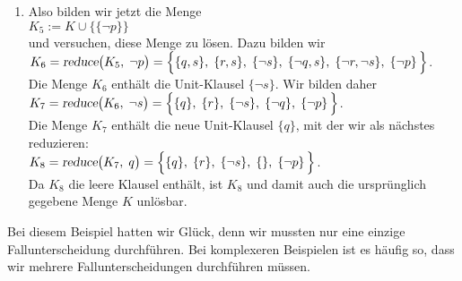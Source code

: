 \begin{enumerate}
\item Also bilden wir jetzt die Menge \\[0.2cm]
      \hspace*{1.3cm} $K_5 := K \cup \bigl\{ \{\neg p\} \bigr\}$ \\[0.2cm]
      und versuchen, diese Menge zu l\"{o}sen.  Dazu bilden wir
      \\[0.2cm]
      \hspace*{1.3cm} 
      $K_6 = \textsl{reduce}\bigl(K_5,\; \neg p\bigr) =\Big\{ \{q, s\},\; \{r, s\},\;\{\neg s\},\; \{\neg q, s\},\; \{\neg r, \neg s\},\;\{\neg p\}\, \Big\}$.
      \\[0.2cm]
      Die Menge $K_6$ enth\"{a}lt die  Unit-Klausel $\{\neg s\}$.  Wir bilden daher \\[0.2cm]
      \hspace*{1.3cm} 
      $K_7 = \textsl{reduce}\bigl(K_6,\; \neg s\bigr) =\Big\{ \{q\},\; \{r\},\;\{\neg s\},\; \{\neg q\},\;\{\neg p\}\, \Big\}$.
      \\[0.2cm]
      Die Menge $K_7$ enth\"{a}lt die neue Unit-Klausel $\{q\}$, mit der wir als n\"{a}chstes reduzieren:\\[0.2cm]
      \hspace*{1.3cm} 
      $K_8 = \textsl{reduce}\bigl(K_7,\; q \bigr) =\Big\{ \{q\},\; \{r\},\;\{\neg s\},\; \{\},\;\{\neg p\}\, \Big\}$.
      \\[0.2cm]
      Da $K_8$ die leere Klausel enth\"{a}lt, ist $K_8$ und damit auch die urspr\"{u}nglich
      gegebene Menge $K$ unl\"{o}sbar.
\end{enumerate}
Bei diesem Beispiel hatten wir Gl\"{u}ck, denn wir mussten nur eine einzige Fallunterscheidung
durchf\"{u}hren. Bei komplexeren Beispielen ist es h\"{a}ufig so, dass wir mehrere Fallunterscheidungen
durchf\"{u}hren m\"{u}ssen.


